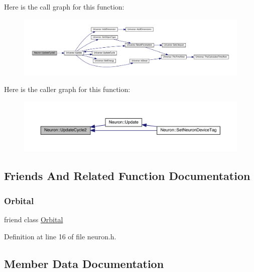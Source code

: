Here is the call graph for this function\+:
\nopagebreak
\begin{figure}[H]
\begin{center}
\leavevmode
\includegraphics[width=350pt]{class_neuron_a55c72e8066caf1ad8e25a2b0b453ee69_cgraph}
\end{center}
\end{figure}
Here is the caller graph for this function\+:
\nopagebreak
\begin{figure}[H]
\begin{center}
\leavevmode
\includegraphics[width=350pt]{class_neuron_a55c72e8066caf1ad8e25a2b0b453ee69_icgraph}
\end{center}
\end{figure}


\subsection{Friends And Related Function Documentation}
\mbox{\label{class_neuron_a2ae3e36fe53bb2c406559e5a7c309027}} 
\subsubsection{\texorpdfstring{Orbital}{Orbital}}
{\footnotesize\ttfamily friend class \hyperlink{class_orbital}{Orbital}\hspace{0.3cm}{\ttfamily [friend]}}



Definition at line 16 of file neuron.\+h.



\subsection{Member Data Documentation}
\mbox{\label{class_neuron_a878a5a42025ba8205adeb9a50b2c1457}} 
